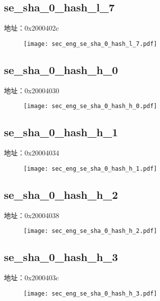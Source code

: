 \subsection{se\_sha\_0\_hash\_l\_7}
\label{sec_eng-se-sha-0-hash-l-7}
地址：0x2000402c
 \begin{figure}[H]
\texttt{[image: sec\_eng\_se\_sha\_0\_hash\_l\_7.pdf]}
\end{figure}

\subsection{se\_sha\_0\_hash\_h\_0}
\label{sec_eng-se-sha-0-hash-h-0}
地址：0x20004030
 \begin{figure}[H]
\texttt{[image: sec\_eng\_se\_sha\_0\_hash\_h\_0.pdf]}
\end{figure}

\subsection{se\_sha\_0\_hash\_h\_1}
\label{sec_eng-se-sha-0-hash-h-1}
地址：0x20004034
 \begin{figure}[H]
\texttt{[image: sec\_eng\_se\_sha\_0\_hash\_h\_1.pdf]}
\end{figure}

\subsection{se\_sha\_0\_hash\_h\_2}
\label{sec_eng-se-sha-0-hash-h-2}
地址：0x20004038
 \begin{figure}[H]
\texttt{[image: sec\_eng\_se\_sha\_0\_hash\_h\_2.pdf]}
\end{figure}

\subsection{se\_sha\_0\_hash\_h\_3}
\label{sec_eng-se-sha-0-hash-h-3}
地址：0x2000403c
 \begin{figure}[H]
\texttt{[image: sec\_eng\_se\_sha\_0\_hash\_h\_3.pdf]}
\end{figure}

